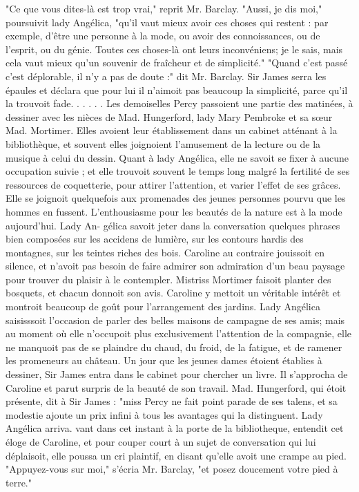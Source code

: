 "Ce que vous dites-là est trop vrai," reprit Mr. Barclay.
"Aussi, je dis moi," poursuivit lady Angélica, "qu'il vaut mieux avoir ces choses qui\setcounter{page}{532} restent : par exemple, d'être une personne à la mode, ou avoir des connoissances, ou de l'esprit, ou du génie. Toutes ces choses-là ont leurs inconvéniens; je le sais, mais cela vaut mieux qu'un souvenir de fraîcheur et de simplicité."
"Quand c'est passé c'est déplorable, il n'y a pas de doute :" dit Mr. Barclay. Sir James serra les épaules et déclara que pour lui il n'aimoit pas beaucoup la simplicité, parce qu'il la trouvoit fade. . . . . .
Les demoiselles Percy passoient une partie des matinées, à dessiner avec les nièces de Mad. Hungerford, lady Mary Pembroke et sa sœur Mad. Mortimer. Elles avoient leur établissement dans un cabinet atténant à la bibliothèque, et souvent elles joignoient l'amusement de la lecture ou de la musique à celui du dessin.
Quant à lady Angélica, elle ne savoit se fixer à aucune occupation suivie ; et elle trouvoit souvent le temps long malgré la fertilité de ses ressources de coquetterie, pour attirer l'attention, et varier l'effet de ses grâces. Elle se joignoit quelquefois aux promenades des jeunes personnes pourvu que les hommes en fussent.
L'enthousiasme pour les beautés de la nature est à la mode aujourd'hui. Lady An-\setcounter{page}{533} gélica savoit jeter dans la conversation quelques phrases bien composées sur les accidens de lumière, sur les contours hardis des montagnes, sur les teintes riches des bois. Caroline au contraire jouissoit en silence, et n'avoit pas besoin de faire admirer son admiration d'un beau paysage pour trouver du plaisir à le contempler.
Mistriss Mortimer faisoit planter des bosquets, et chacun donnoit son avis. Caroline y mettoit un véritable intérêt et montroit beaucoup de goût pour l'arrangement des jardins. Lady Angélica saisisssoit l'occasion de parler des belles maisons de campagne de ses amis; mais au moment où elle n'occupoit plus exclusivement l'attention de la compagnie, elle ne manquoit pas de se plaindre du chaud, du froid, de la fatigue, et de ramener les promeneurs au château.
Un jour que les jeunes dames étoient établies à dessiner, Sir James entra dans le cabinet pour chercher un livre. Il s'approcha de Caroline et parut surpris de la beauté de son travail. Mad. Hungerford, qui étoit présente, dit à Sir James : "miss Percy ne fait point parade de ses talens, et sa modestie ajoute un prix infini à tous les avantages qui la distinguent. Lady Angélica arriva.\setcounter{page}{534} vant dans cet instant à la porte de la bibliotheque, entendit cet éloge de Caroline, et pour couper court à un sujet de conversation qui lui déplaisoit, elle poussa un cri plaintif, en disant qu’elle avoit une crampe au pied. "Appuyez-vous sur moi," s’écria Mr. Barclay, "et posez doucement votre pied à terre."
